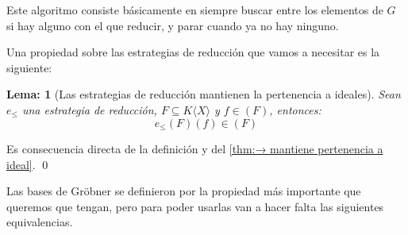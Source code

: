 \documentclass[12pt]{report}
\theoremstyle{customstyle}
\newtheorem{lemma}{Lema:}[chapter]
\renewenvironment{proof}[1][\proofname]{{\bfseries #1: }}{\qed} %
\theoremstyle{factstyle}
\begin{document}
Este algoritmo consiste básicamente en siempre buscar entre los elementos de $G$ si hay alguno con el que reducir, y parar cuando ya no hay ninguno.

Una propiedad sobre las estrategias de reducción que vamos a necesitar es la siguiente:

\begin{lemma}[Las estrategias de reducción mantienen la pertenencia a ideales]\label{lemma:e mantiene pertenencia a ideal}
  Sean $e_≤$ una estrategia de reducción, $F ⊆ K⟨X⟩$ y $f ∈ (F)$, entonces:
  \[ e_≤(F)(f) ∈ (F) \]
\end{lemma}
\begin{proof}
  Es consecuencia directa de la definición y del \cref{thm:→ mantiene pertenencia a ideal}.
\end{proof}

Las bases de Gröbner se definieron por la propiedad más importante que queremos que tengan, pero para poder usarlas van a hacer falta las siguientes equivalencias.
\end{document}
